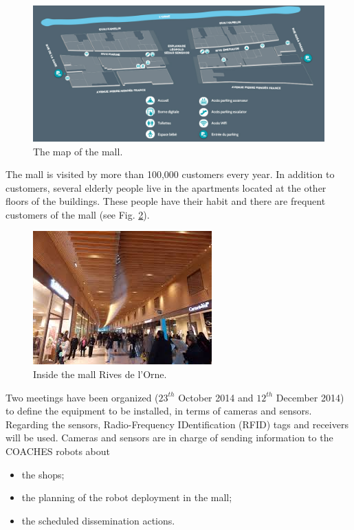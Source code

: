 \begin{figure}[!t]
\begin{center}
\includegraphics[width=1.0\linewidth]{mallplan}
\caption{The map of the mall.}
\label{fig:map}
\end{center}
\end{figure}

The mall is visited by more than 100,000 customers every year. In addition to customers,
several elderly people
live in the apartments located at the other floors of the buildings. These people have their habit and there are frequent customers of the mall (see Fig. \ref{fig:insidemall}).

\begin{figure}[!t]
\begin{center}
\includegraphics[width=0.5\linewidth]{InsideRivedelOrne}
\caption{Inside the mall Rives de l'Orne.}
\label{fig:insidemall}
\end{center}
\end{figure}

Two meetings have been organized ($23^{th}$ October 2014 and $12^{th}$ December 2014) to define the equipment to be installed, in terms of cameras and sensors.
Regarding the sensors, Radio-Frequency IDentification (RFID) tags and receivers will be used.
Cameras and sensors are in charge of sending information to the COACHES robots
about
\begin{itemize}
\item the shops;
\item the planning of the robot deployment in the mall;
\item the scheduled dissemination actions.
\end{itemize}

